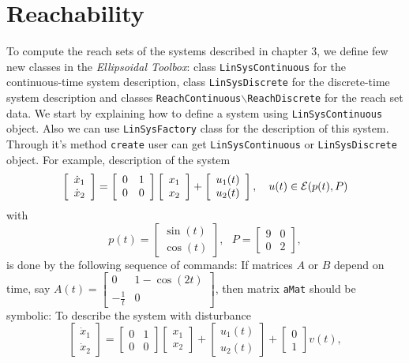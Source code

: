 \section{Reachability}
To compute the reach sets of the systems described in chapter 3, we define
few new classes in the {\it Ellipsoidal Toolbox}: class {\tt LinSysContinuous}
for the continuous-time system description, class {\tt LinSysDiscrete}
for the discrete-time system description and classes {\tt ReachContinuous$\backslash$ReachDiscrete} for the reach set data. We start by explaining how to define a system
using {\tt LinSysContinuous} object. Also we can use {\tt LinSysFactory} class for the description of this system.
Through it's method {\tt create} user can get {\tt LinSysContinuous} or {\tt LinSysDiscrete} object.
For example, description of the system
\[ \left[\begin{array}{cc}
\dot{x}_1\\
\dot{x}_2\end{array}\right] = \left[\begin{array}{cc}
0 & 1\\
0 & 0\end{array}\right]\left[\begin{array}{c}
x_1\\
x_2\end{array}\right] + \left[\begin{array}{c}
u_1(t)\\
u_2(t)\end{array}\right], ~~~ u(t)\in\EE(p(t), P) \]
with
\[ p(t) = \left[\begin{array}{c}
\sin(t)\\
\cos(t)\end{array}\right], ~~~ P = \left[\begin{array}{cc}
9 & 0\\
0 & 2\end{array}\right], \]
is done by the following sequence of commands:
If matrices $A$ or $B$ depend on time, say $A(t)=\left[\begin{array}{cc}
0 & 1-\cos(2t)\\
-\frac{1}{t} & 0\end{array}\right]$, then matrix {\tt aMat} should be symbolic:
To describe the system with disturbance
\[ \left[\begin{array}{cc}
\dot{x}_1\\
\dot{x}_2\end{array}\right] = \left[\begin{array}{cc}
0 & 1\\
0 & 0\end{array}\right]\left[\begin{array}{c}
x_1\\
x_2\end{array}\right] + \left[\begin{array}{c}
u_1(t)\\
u_2(t)\end{array}\right] + \left[\begin{array}{c}
0\\
1\end{array}\right]v(t), \]
